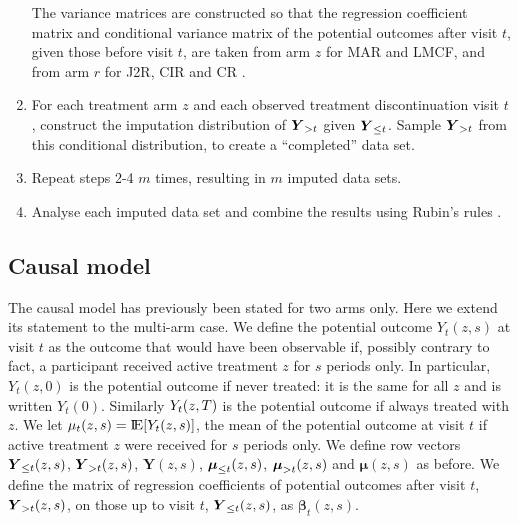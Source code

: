 \begin{enumerate}
The variance matrices are constructed so that the regression coefficient matrix and conditional variance matrix of the potential outcomes after visit  $t$, given those before visit $t$, are taken from arm $z$ for MAR and LMCF, and from arm $r$ for J2R, CIR and CR 
\citet{Carpenter++13,ian:RBIcausal}.

\item For each treatment arm $z$ and each observed treatment discontinuation visit $t$, construct the imputation distribution of  $\boldsymbol{Y}_{{>t}}$ given  $\boldsymbol{Y}_{{\le{t}}}$. 
Sample $\boldsymbol{Y}_{{>t}}$ from this   conditional distribution, to create a “completed” data set.

\item Repeat steps 2-4 $m$ times, resulting in $m$ imputed data sets.

\item Analyse each imputed data set and combine the results using Rubin's rules \citep{Rubin87}.

\end{enumerate}



\subsection{Causal model}

The causal model has previously been stated for two arms only. Here we extend its statement to the multi-arm case. 
We define the potential outcome $Y_t(z,s)$ at visit $t$ as the outcome that would have been observable if, possibly contrary to fact, a participant received active treatment $z$ for $s$ periods only.
In particular, $Y_t(z,0)$ is the potential outcome if never treated: it is the same for all $z$ and is written $Y_t(0)$. Similarly $Y_t(z,T)$ is the potential outcome if always treated with $z$.
We let 
$\mu_t(z,s) = \E[Y_t(z,s)]$, the mean of the potential outcome at visit $t$ if active treatment $z$ were received for $s$ periods only. 
We define row vectors
$\boldsymbol{Y}_{{\le{t}}}(z,s)$, $\boldsymbol{Y}_{{>t}}(z,s)$, $\boldsymbol{Y}(z,s)$,
$\boldsymbol{\mu}_{\le{t}}(z,s)$, $\boldsymbol{\mu}_{>t}(z,s)$ and $\boldsymbol{\mu}(z,s)$
 as before.
We define 
the matrix of regression coefficients of  potential outcomes after visit  $t$, $\boldsymbol{Y}_{{>t}}(z,s)$, on those up to visit  $t$,  $\boldsymbol{Y}_{{\le{t}}}(z,s)$,
as $\boldsymbol{\beta}_t(z,s)$.


